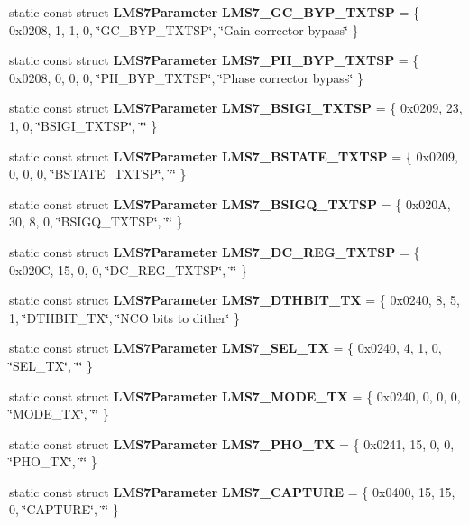 \begin{DoxyCompactItemize}
\item 
static const struct {\bf L\+M\+S7\+Parameter} {\bf L\+M\+S7\+\_\+\+G\+C\+\_\+\+B\+Y\+P\+\_\+\+T\+X\+T\+SP} = \{ 0x0208, 1, 1, 0, \char`\"{}\+G\+C\+\_\+\+B\+Y\+P\+\_\+\+T\+X\+T\+S\+P\char`\"{}, \char`\"{}\+Gain corrector bypass\char`\"{} \}
\item 
static const struct {\bf L\+M\+S7\+Parameter} {\bf L\+M\+S7\+\_\+\+P\+H\+\_\+\+B\+Y\+P\+\_\+\+T\+X\+T\+SP} = \{ 0x0208, 0, 0, 0, \char`\"{}\+P\+H\+\_\+\+B\+Y\+P\+\_\+\+T\+X\+T\+S\+P\char`\"{}, \char`\"{}\+Phase corrector bypass\char`\"{} \}
\item 
static const struct {\bf L\+M\+S7\+Parameter} {\bf L\+M\+S7\+\_\+\+B\+S\+I\+G\+I\+\_\+\+T\+X\+T\+SP} = \{ 0x0209, 23, 1, 0, \char`\"{}\+B\+S\+I\+G\+I\+\_\+\+T\+X\+T\+S\+P\char`\"{}, \char`\"{}\char`\"{} \}
\item 
static const struct {\bf L\+M\+S7\+Parameter} {\bf L\+M\+S7\+\_\+\+B\+S\+T\+A\+T\+E\+\_\+\+T\+X\+T\+SP} = \{ 0x0209, 0, 0, 0, \char`\"{}\+B\+S\+T\+A\+T\+E\+\_\+\+T\+X\+T\+S\+P\char`\"{}, \char`\"{}\char`\"{} \}
\item 
static const struct {\bf L\+M\+S7\+Parameter} {\bf L\+M\+S7\+\_\+\+B\+S\+I\+G\+Q\+\_\+\+T\+X\+T\+SP} = \{ 0x020\+A, 30, 8, 0, \char`\"{}\+B\+S\+I\+G\+Q\+\_\+\+T\+X\+T\+S\+P\char`\"{}, \char`\"{}\char`\"{} \}
\item 
static const struct {\bf L\+M\+S7\+Parameter} {\bf L\+M\+S7\+\_\+\+D\+C\+\_\+\+R\+E\+G\+\_\+\+T\+X\+T\+SP} = \{ 0x020\+C, 15, 0, 0, \char`\"{}\+D\+C\+\_\+\+R\+E\+G\+\_\+\+T\+X\+T\+S\+P\char`\"{}, \char`\"{}\char`\"{} \}
\item 
static const struct {\bf L\+M\+S7\+Parameter} {\bf L\+M\+S7\+\_\+\+D\+T\+H\+B\+I\+T\+\_\+\+TX} = \{ 0x0240, 8, 5, 1, \char`\"{}\+D\+T\+H\+B\+I\+T\+\_\+\+T\+X\char`\"{}, \char`\"{}\+N\+C\+O bits to dither\char`\"{} \}
\item 
static const struct {\bf L\+M\+S7\+Parameter} {\bf L\+M\+S7\+\_\+\+S\+E\+L\+\_\+\+TX} = \{ 0x0240, 4, 1, 0, \char`\"{}\+S\+E\+L\+\_\+\+T\+X\char`\"{}, \char`\"{}\char`\"{} \}
\item 
static const struct {\bf L\+M\+S7\+Parameter} {\bf L\+M\+S7\+\_\+\+M\+O\+D\+E\+\_\+\+TX} = \{ 0x0240, 0, 0, 0, \char`\"{}\+M\+O\+D\+E\+\_\+\+T\+X\char`\"{}, \char`\"{}\char`\"{} \}
\item 
static const struct {\bf L\+M\+S7\+Parameter} {\bf L\+M\+S7\+\_\+\+P\+H\+O\+\_\+\+TX} = \{ 0x0241, 15, 0, 0, \char`\"{}\+P\+H\+O\+\_\+\+T\+X\char`\"{}, \char`\"{}\char`\"{} \}
\item 
static const struct {\bf L\+M\+S7\+Parameter} {\bf L\+M\+S7\+\_\+\+C\+A\+P\+T\+U\+RE} = \{ 0x0400, 15, 15, 0, \char`\"{}\+C\+A\+P\+T\+U\+R\+E\char`\"{}, \char`\"{}\char`\"{} \}

\end{DoxyCompactItemize}

